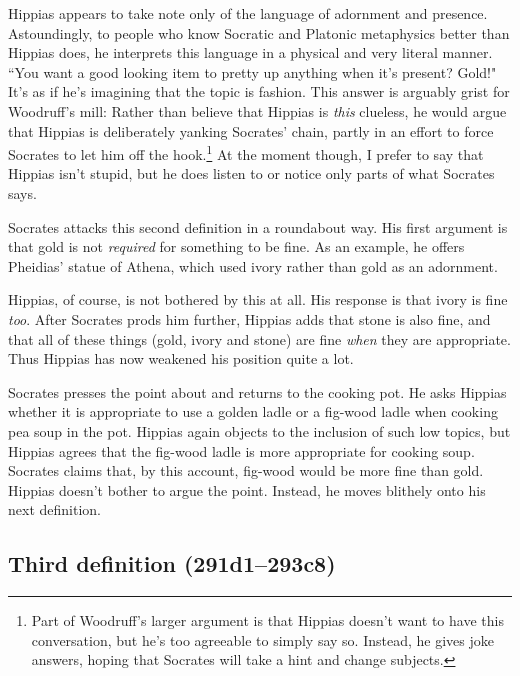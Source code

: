 \documentclass[11pt]{article}
\begin{document}
Hippias appears to take note only of the language of adornment and
presence.  Astoundingly, to people who know Socratic and Platonic
metaphysics better than Hippias does, he interprets this language in
a physical and very literal manner.  ``You want a good looking item to
pretty up anything when it's present?  Gold!"  It's as if he's imagining
that the topic is fashion.  This answer is arguably grist for Woodruff's
mill: Rather than believe that Hippias is \emph{this} clueless, he would
argue that Hippias is deliberately yanking Socrates' chain, partly in an
effort to force Socrates to let him off the hook.\footnote{Part of
Woodruff's larger argument is that Hippias doesn't want to have this
conversation, but he's too agreeable to simply say so.  Instead, he gives
joke answers, hoping that Socrates will take a hint and change subjects.}
At the moment though, I prefer to say that Hippias isn't stupid, but he
does listen to or notice only parts of what Socrates says.

Socrates attacks this second definition in a roundabout way.  His first
argument is that gold is not \emph{required} for something to be fine.  As
an example, he offers Pheidias' statue of Athena, which used ivory rather
than gold as an adornment.

Hippias, of course, is not bothered by this at all.  His response is that
ivory is fine \emph{too}.  After Socrates prods him further, Hippias adds
that stone is also fine, and that all of these things (gold, ivory and
stone) are fine \emph{when} they are appropriate.  Thus Hippias has now
weakened his position quite a lot.

Socrates presses the point about  and returns to the
cooking pot.  He asks Hippias whether it is appropriate to use a golden
ladle or a fig-wood ladle when cooking pea soup in the pot.  Hippias again
objects to the inclusion of such low topics, but Hippias agrees that the
fig-wood ladle is more appropriate for cooking soup.  Socrates claims that,
by this account, fig-wood would be more fine than gold.  Hippias doesn't
bother to argue the point.  Instead, he moves blithely onto his next
definition.


\subsection{Third definition (291d1--293c8)}
\end{document}
